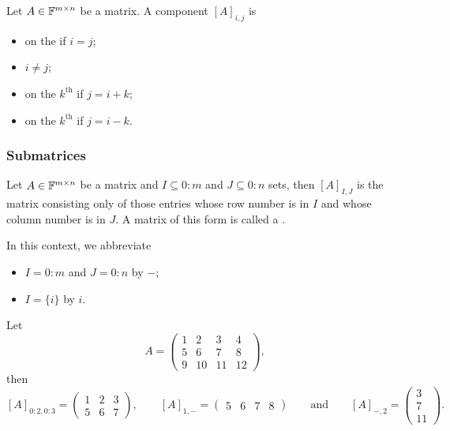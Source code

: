 \begin{definition}
Let $A\in\mathbb{F}^{m\times n}$ be a matrix. A component $[A]_{i,j}$ is
\begin{itemize}
\item on the  if $i=j$;
\item {} $i\neq j$;
\item on the $k^\text{th}$  if $j = i+k$;
\item on the $k^\text{th}$  if $j = i-k$.
\end{itemize}
\end{definition}

\subsubsection{Submatrices}
\begin{definition}
Let $A\in\mathbb{F}^{m\times n}$ be a matrix and $I\subseteq 0:m$ and $J\subseteq 0:n$ sets, then $[A]_{I,J}$ is the matrix consisting only of those entries whose row number is in $I$ and whose column number is in $J$. A matrix of this form is called a .

In this context, we abbreviate
\begin{itemize}
\item $I = 0:m$ and $J = 0:n$ by $-$;
\item $I=\{i\}$ by $i$.
\end{itemize}
\end{definition}

\begin{example}
Let
\[ A = \begin{pmatrix}
1 & 2 & 3 & 4 \\ 5 & 6 & 7 & 8 \\ 9 & 10 & 11 & 12
\end{pmatrix}, \]
then
\[ [A]_{0:2,0:3} = \begin{pmatrix}
1 & 2 & 3 \\ 5 & 6 & 7
\end{pmatrix}, \qquad [A]_{1,-} = \begin{pmatrix}
5 & 6 & 7 & 8
\end{pmatrix} \qquad\text{and}\qquad [A]_{-, 2} =  \begin{pmatrix}
3 \\ 7 \\ 11
\end{pmatrix}. \]
\end{example}

